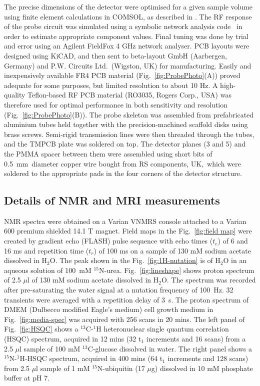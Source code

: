 \documentclass[preprint,5p]{elsarticle}
\newcommand{\fig}[1]{Fig.~\ref{#1}}
\begin{document}
The precise dimensions of the detector were optimised for a given sample volume
using finite element calculations in COMSOL, as described in \cite{gream_2016}.
The RF response of the probe circuit was simulated using a symbolic network
analysis code~\cite{gream-thesis} in order to estimate appropriate component
values. Final tuning was done by trial and error using an Agilent FieldFox 4 GHz
network analyser. PCB layouts were designed using KiCAD, and then sent to
beta-layout GmbH (Aarbergen, Germany) and P.W. Circuits Ltd.~(Wigston, UK) for
manufacturing. Easily and inexpensively available FR4 PCB material
(\fig{fig:ProbePhoto}(A)) proved adequate for some purposes, but limited
resolution to about 10 Hz. A high-quality Teflon-based RF PCB material (RO3035,
Rogers Corp., USA) was therefore used for optimal performance in both
sensitivity and resolution (\fig{fig:ProbePhoto}(B)). The probe skeleton was
assembled from prefabricated aluminium tubes held together with the precision-machined
scaffold disks using brass screws. Semi-rigid transmission lines were then
threaded through the tubes, and the TMPCB plate was soldered on top. The
detector planes (3 and 5) and the PMMA spacer between them were assembled using
short bits of 0.5~mm\cbstart\ diameter copper wire bought from RS components, UK,\cbend\ which were soldered to the appropriate pads in the four corners of the detector structure.

\cbstart
\subsection{Details of NMR and MRI measurements}
NMR spectra were obtained on a Varian VNMRS console attached to a Varian 600 premium shielded 14.1 T magnet. Field maps in the \fig{fig:field map} were created by gradient echo (FLASH) pulse sequence with echo times ($t_{e}$) of 6 and 16 ms and repetition time ($t_{r}$) of 100 ms on a sample of 130 mM  sodium acetate dissolved in H$_2$O. The peak shown in the \fig{fig:1H-nutation} is of H$_2$O in an aqueous solution of 100~mM $^{15}$N-urea. \fig{fig:lineshape} shows proton spectrum of 2.5 $\mu$l of 130 mM  sodium acetate dissolved in H$_2$O. The spectrum was recorded after pre-saturating the water signal at a nutation frequency of 100~Hz. 32 transients were averaged with a repetition delay of 3~s. The proton spectrum of DMEM (Dulbecco
modified Eagle's medium) cell growth medium in \fig{fig:media-spec} was acquired with 256 scans in 20 mins.
The left panel of \fig{fig:HSQC} shows a $^{13}$C-$^{1}$H heteronuclear single
quantum correlation (HSQC) spectrum, acquired in 12 mins (32 t$_1$ increments
and 16 scans) from a 2.5 $\mu$l sample of 100 mM $^{13}$C-glucose dissolved in
water. The right panel shows a $^{15}$N-$^{1}$H-HSQC spectrum, acquired in 400
mins (64 t$_1$ increments and 128 scans) from 2.5 $\mu$l sample of 1 mM
$^{15}$N-ubiquitin (17 $\mu$g) dissolved in 10 mM phosphate buffer at pH 7.
\end{document}

